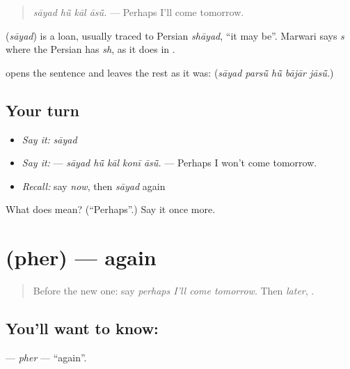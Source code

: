 \begin{quote}
\emph{sāyad hū̃ kāl āsū̃.} — Perhaps I'll come tomorrow.
\end{quote}

\begin{cousinweb}
\textbf{} (\emph{sāyad}) is a loan, usually traced to Persian \emph{shāyad}, \textquotedblleft{}it may be\textquotedblright{}. Marwari says \emph{s} where the Persian has \emph{sh}, as it does in \textbf{}.
\end{cousinweb}

\begin{grammarlens}[title={What you've built}]
\textbf{} opens the sentence and leaves the rest as it was: \textbf{    } (\emph{sāyad parsū̃ hū̃ bājār jāsū̃.})
\end{grammarlens}

\subsection*{Your turn}
\begin{itemize}
\raggedright
  \item \emph{Say it:} \emph{sāyad}
  \item \emph{Say it:} \textbf{    } — \emph{sāyad hū̃ kāl konī āsū̃.} — Perhaps I won't come tomorrow.
  \item \emph{Recall:} say \emph{now}, then \emph{sāyad} again
\end{itemize}

\begin{tcolorbox}[breakable,colback=teal!4,colframe=teal!35!black,title={Before you move on}]
What does \textbf{} mean? (\textquotedblleft{}Perhaps\textquotedblright{}.) Say it once more.
\end{tcolorbox}
\section[\texorpdfstring{\mw{फेर} (pher)}{फेर (pher)}]{ (pher) — again}

\label{lesson:MW-C163-pher}



\begin{quote}
Before the new one: say \emph{perhaps I'll come tomorrow}. Then \emph{later}, \textbf{}.
\end{quote}

\subsection*{You'll want to know: }
\textbf{} — \emph{pher} — \textquotedblleft{}again\textquotedblright{}.

